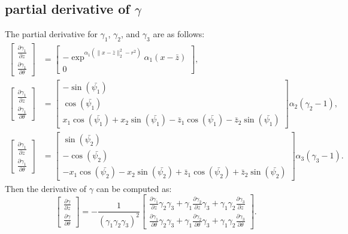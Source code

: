 \documentclass[letterpaper, 10 pt, conference]{ieeeconf}  %
\begin{document}
\subsection{partial derivative of $\gamma$}
The partial derivative for $\gamma_1$, $\gamma_2$, and $\gamma_3$ are as follows:
\begin{equation*}
\begin{split}
\begin{bmatrix}
\frac{\partial \gamma_1}{\partial z}\\
\frac{\partial \gamma_1}{\partial \theta}
\end{bmatrix}&=
\begin{bmatrix}
-\exp^{\alpha_1(\|x-\bar{z}\|^2_2-r^2)}\alpha_1(x-\bar{z})\\
0
\end{bmatrix},\\
\begin{bmatrix}
\frac{\partial \gamma_1}{\partial z}\\
\frac{\partial \gamma_1}{\partial \theta}
\end{bmatrix}&=
\begin{bmatrix}
-\sin(\bar{\psi_1})\\
\cos(\bar{\psi_1})\\
x_1\cos(\bar{\psi_1})+x_2\sin(\bar{\psi_1})-\bar{z}_1\cos(\bar{\psi_1})-\bar{z}_2\sin(\bar{\psi_1})
\end{bmatrix}\alpha_2(\gamma_2-1),\\
\begin{bmatrix}
\frac{\partial \gamma_1}{\partial z}\\
\frac{\partial \gamma_1}{\partial \theta}
\end{bmatrix}&=
\begin{bmatrix}
\sin(\bar{\psi_2})\\
-\cos(\bar{\psi_2})\\
-x_1\cos(\bar{\psi_2})-x_2\sin(\bar{\psi_2})+\bar{z}_1\cos(\bar{\psi_2})+\bar{z}_2\sin(\bar{\psi_2})
\end{bmatrix}\alpha_3(\gamma_3-1).
\end{split}
\end{equation*}
Then the derivative of $\gamma$ can be computed as:
\begin{equation*}
\begin{bmatrix}
\frac{\partial \gamma}{\partial z}\\
\frac{\partial \gamma}{\partial \theta}
\end{bmatrix}=
-\frac{1}{(\gamma_1\gamma_2\gamma_3)^2}\begin{bmatrix}
\frac{\partial \gamma_1}{\partial z}\gamma_2\gamma_3+\gamma_1\frac{\partial \gamma_2}{\partial z}\gamma_3+\gamma_1\gamma_2\frac{\partial \gamma_3}{\partial z}\\
\frac{\partial \gamma_1}{\partial \theta}\gamma_2\gamma_3+\gamma_1\frac{\partial \gamma_2}{\partial \theta}\gamma_3+\gamma_1\gamma_2\frac{\partial \gamma_3}{\partial \theta}
\end{bmatrix}.
\end{equation*}
\end{document}
